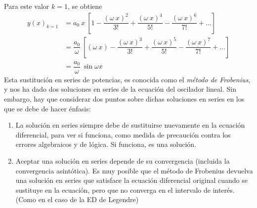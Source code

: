 Para este valor $k = 1$, se obtiene
\begin{align}
y(x)_{k = 1} &= a_{0} \: x \: \left[ 1 - \dfrac{(\omega \: x)^{2}}{3!} + \dfrac{(\omega \: x)^{4}}{5!} - \dfrac{(\omega \: x)^{6}}{7!} + \ldots \right] \nonumber \\[0.5em]
&= \dfrac{a_{0}}{\omega} \: \left[ (\omega \: x) - \dfrac{(\omega \: x)^{3}}{3!} + \dfrac{(\omega \: x)^{5}}{5!} - \dfrac{(\omega \: x)^{7}}{7!} + \ldots \right] \nonumber \\[0.5em]
&= \dfrac{a_{0}}{\omega} \: \sin \omega x
\label{eq:ecuacion_09_94}
\end{align}
Esta sustitución en series de potencias, es conocida como el \emph{método de Frobenius}, y nos ha dado dos soluciones en series de la ecuación del oscilador lineal. Sin embargo, hay que considerar dos puntos sobre dichas soluciones en series en los que se debe de hacer énfasis:
\begin{enumerate}
\item La solución en series siempre debe de sustituirse nuevamente en la ecuación diferencial, para ver si funciona, como medida de precaución contra los errores algebraicos y de lógica. Si funciona, es una solución.
\item Aceptar una solución en series depende de su convergencia (incluida la convergencia asintótica). Es muy posible que el método de Frobenius devuelva una solución en series que satisface la ecuación diferencial original cuando se sustituye en la ecuación, pero que no converga en el intervalo de interés. (Como en el caso de la ED de Legendre)
\end{enumerate}
